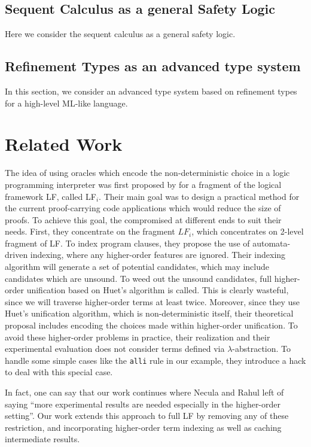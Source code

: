 \documentclass{acmconf}
\begin{document}
\subsection{Sequent Calculus as a general Safety Logic}
Here we consider the sequent calculus as a general safety logic.

\subsection{Refinement Types as an advanced type system}
In this section, we consider an advanced type system based on
refinement types for a high-level ML-like language. 


\section{Related Work}
The idea of using oracles which encode the non-deterministic choice in
a logic programming interpreter was first proposed by
\cite{Necula+01:oracle} for a fragment of the logical framework LF,
called LF$_i$. Their main goal was to design a practical method for
the current proof-carrying code applications which would reduce the
size of proofs. To achieve this goal, the compromised at different
ends to suit their needs. First, they concentrate on the 
fragment $LF_i$, which concentrates on 2-level fragment of
LF. To index program clauses, they propose the use of automata-driven
indexing, where any higher-order features are ignored. Their
indexing algorithm will generate a set of potential candidates, which
may include candidates which are unsound. To weed out the unsound
candidates, full higher-order unification based on Huet's algorithm is
called. This is clearly wasteful, since we will traverse higher-order
terms at least twice. Moreover, since they use Huet's unification
algorithm, which is non-deterministic itself, their theoretical
proposal includes encoding the choices made within higher-order
unification. To avoid these higher-order problems in practice, their
realization and their experimental evaluation does not consider 
terms defined via $\lambda$-abstraction. To handle some simple cases
like the {\tt alli} rule in our example, they introduce a hack to deal
with this special case. 

In fact, one can say that  our work continues where Necula and Rahul
left of saying ``more experimental results are needed especially in
the higher-order setting''. Our work extends this approach to full LF
by removing any of these restriction, and incorporating higher-order
term indexing as well as caching intermediate results.
\end{document}
